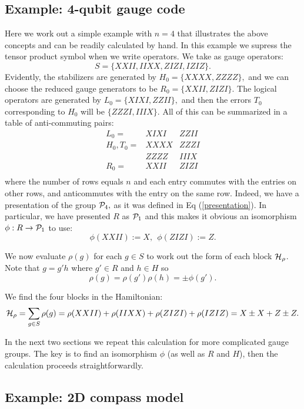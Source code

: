 \documentclass[12pt,notitlepage,longbibliography,nofootinbib,tightenlines]{revtex4}
\begin{document}
\subsection{Example: 4-qubit gauge code}

Here we work out a simple example with $n=4$
that illustrates the above concepts and can
be readily calculated by hand.
In this example we supress the tensor product
symbol when we write operators.
We take as gauge operators:
$$
    S = \{XXII, IIXX, ZIZI, IZIZ\}.
$$
Evidently, the stabilizers are generated by $H_0=\{XXXX, ZZZZ\},$
and we can choose the reduced gauge generators to be $R_0=\{XXII, ZIZI\}.$
The logical operators are generated by $L_0 = \{XIXI, ZZII\},$
and then the errors $T_0$ corresponding to $H_0$ will
be $\{ZZZI, IIIX\}.$
All of this can be summarized in a table of anti-commuting pairs:
$$
\begin{array}{rll}
L_0 = &XIXI & ZZII \\
H_0, T_0 = &XXXX & ZZZI \\
           &ZZZZ & IIIX \\
R_0 = &XXII & ZIZI \\
\end{array}
$$
where the number of rows equals $n$ and each entry
commutes with the entries on other rows, and anticommutes
with the entry on the same row. Indeed, we have a presentation
of the group $\mathcal{P}_4,$ as it was defined in Eq (\ref{presentation}).
In particular, we have presented $R$ as $\mathcal{P}_1$ and this
makes it obvious an isomorphism $\phi:R\to \mathcal{P}_1$
to use: %
$$
    \phi(XXII) := X, \ \ \phi(ZIZI) := Z.
$$

We now evaluate $\rho(g)$ for each $g\in S$ 
to work out the form of each block $\mathcal{H}_\rho$.
Note that $g=g'h$ where $g'\in R$ and $h\in H$
so 
$$\rho(g)=\rho(g')\rho(h)=\pm\phi(g').$$

We find the four blocks in the Hamiltonian:
$$
\mathcal{H}_\rho = \sum_{g\in S} \rho(g) = \rho(XXII) + \rho(IIXX) + \rho(ZIZI) + \rho(IZIZ) = X \pm X + Z \pm Z.
$$

In the next two sections we repeat this calculation for
more complicated gauge groups.
The key is to find an isomorphism $\phi$ (as well as $R$ and $H$),
then the calculation proceeds straightforwardly.

%
%

\subsection{Example: 2D compass model}
\end{document}
